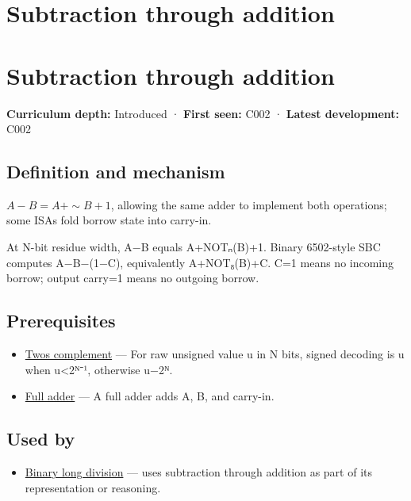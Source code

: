 \hypertarget{appendix-1c7df340573e}{}
\section*{Subtraction through addition}
\section{Subtraction through addition}\label{appendix-1c7df340573e-subtraction-through-addition}

\textbf{Curriculum depth:} Introduced · \textbf{First seen:} C002 · \textbf{Latest development:} C002

\subsection{Definition and mechanism}\label{appendix-1c7df340573e-definition-and-mechanism}

\(A-B=A+\sim B+1\), allowing the same adder to implement both operations; some ISAs fold borrow state into carry-in.

At N-bit residue width, A−B equals A+NOTₙ(B)+1. Binary 6502-style SBC computes A−B−(1−C), equivalently A+NOT₈(B)+C. C=1 means no incoming borrow; output carry=1 means no outgoing borrow.

\subsection{Prerequisites}\label{appendix-1c7df340573e-prerequisites}

\begin{itemize}
\tightlist
\item
  \hyperref[appendix-4fbc03d20829]{Two\textquotesingle s complement} --- For raw unsigned value u in N bits, signed decoding is u when u\textless2ᴺ⁻¹, otherwise u−2ᴺ.
\item
  \hyperref[appendix-d1a5b1e520c2]{Full adder} --- A full adder adds A, B, and carry-in.
\end{itemize}

\subsection{Used by}\label{appendix-1c7df340573e-used-by}

\begin{itemize}
\tightlist
\item
  \hyperref[appendix-89985e6a2685]{Binary long division} --- uses subtraction through addition as part of its representation or reasoning.
\end{itemize}

